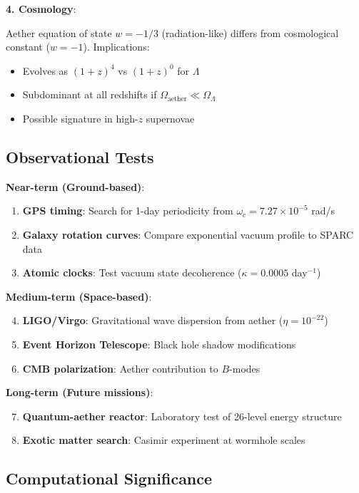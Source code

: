 \documentclass[12pt,a4paper]{article}
\begin{document}
\textbf{4. Cosmology}:

Aether equation of state $w = -1/3$ (radiation-like) differs from cosmological constant ($w = -1$). Implications:
\begin{itemize}
    \item Evolves as $(1+z)^4$ vs $(1+z)^0$ for $\Lambda$
    \item Subdominant at all redshifts if $\Omega_{\text{aether}} \ll \Omega_\Lambda$
    \item Possible signature in high-$z$ supernovae
\end{itemize}

\subsection{Observational Tests}

\textbf{Near-term (Ground-based)}:
\begin{enumerate}
    \item \textbf{GPS timing}: Search for 1-day periodicity from $\omega_c = 7.27 \times 10^{-5}$ rad/s
    \item \textbf{Galaxy rotation curves}: Compare exponential vacuum profile to SPARC data \cite{Lelli2016}
    \item \textbf{Atomic clocks}: Test vacuum state decoherence ($\kappa = 0.0005$ day$^{-1}$)
\end{enumerate}

\textbf{Medium-term (Space-based)}:
\begin{enumerate}
    \setcounter{enumi}{3}
    \item \textbf{LIGO/Virgo}: Gravitational wave dispersion from aether ($\eta = 10^{-22}$)
    \item \textbf{Event Horizon Telescope}: Black hole shadow modifications
    \item \textbf{CMB polarization}: Aether contribution to $B$-modes
\end{enumerate}

\textbf{Long-term (Future missions)}:
\begin{enumerate}
    \setcounter{enumi}{6}
    \item \textbf{Quantum-aether reactor}: Laboratory test of 26-level energy structure
    \item \textbf{Exotic matter search}: Casimir experiment at wormhole scales
\end{enumerate}

\subsection{Computational Significance}
\end{document}
